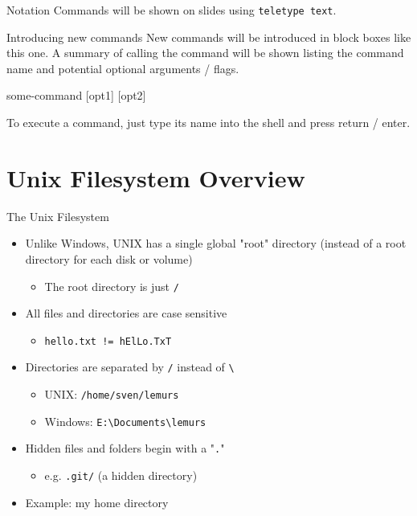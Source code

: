\begin{frame}[fragile]{Notation}
  Commands will be shown on slides using \texttt{teletype text}.

  \begin{block}{Introducing new commands}
    New commands will be introduced in block boxes like this one.  A summary of calling the command will
    be shown listing the command name and potential optional arguments / flags.

    \begin{center}
      some-command [opt1] [opt2]
    \end{center}
    \vspace*{1em}
  \end{block}

  To execute a command, just type its name into the shell and press return / enter.
\end{frame}

%
\section{Unix Filesystem Overview}
\label{sec:unix_filesystem_overview}

\begin{frame}{The Unix Filesystem}
  \begin{itemize}[<+- | alert@+>]
    \item Unlike Windows, UNIX has a single global "root" directory (instead of a root directory for each disk or volume)
    \begin{itemize}[<+- | alert@+>]
      \item The root directory is just \texttt{/}
    \end{itemize}
    \item All files and directories are case sensitive
    \begin{itemize}[<+- | alert@+>]
      \item \texttt{hello.txt != hElLo.TxT}
    \end{itemize}
    \item Directories are separated by \texttt{/} instead of \texttt{\textbackslash}
    \begin{itemize}[<+- | alert@+>]
      \item UNIX: \texttt{/home/sven/lemurs}
      \item Windows: \texttt{E:\textbackslash Documents\textbackslash lemurs}
    \end{itemize}
    \item Hidden files and folders begin with a "\texttt{.}"
    \begin{itemize}[<+- | alert@+>]
      \item e.g. \texttt{.git/} (a hidden directory)
    \end{itemize}
    \item Example: my home directory
  \end{itemize}
\end{frame}

